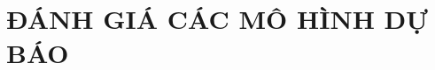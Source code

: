 \chapter{ĐÁNH GIÁ CÁC MÔ HÌNH DỰ BÁO}





\changefontsizes{13pt}
\setlength{\parindent}{0cm}


\begin{center}
	\begin{figure}[htp]
		\begin{center}
		\end{center}
	\end{figure}
\end{center}
